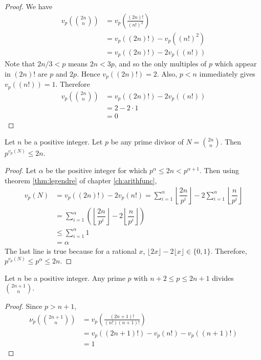 \documentclass{subfile}
\begin{document}
	\begin{proof}
		We have
		\begin{align*}
			v_p \left(\binom{2n}n\right)
				& =v_p \left(\frac{(2n)!}{(n!)^2}\right)\\
				& = v_p((2n)!) - v_p((n!)^2)\\
				& = v_p((2n)!) - 2v_p((n!))
		\end{align*}
		Note that $2n/3<p$ means $2n<3p$, and so the only multiples of $p$ which appear in $(2n)!$ are $p$ and $2p$. Hence $v_p((2n)!) = 2$. Also, $p<n$ immediately gives $v_p((n!))=1$. Therefore
		\begin{align*}
			v_p \left(\binom{2n}n\right)
				& = v_p((2n)!) - 2v_p((n!))\\
				& =  2 - 2 \cdot 1\\
				& = 0
		\end{align*}
	\end{proof}

	\begin{lemma}\label{lem:bertrand3}
		Let $n$ be a positive integer. Let $p$ be any prime divisor of $N=\binom{2n}n$. Then $p^{v_p(N)}\leq2n$.
	\end{lemma}

	\begin{proof}
		Let $\alpha$ be the positive integer for which $p^\alpha \leq 2n<p^{\alpha +1}$. Then using theorem \autoref{thm:legendre} of chapter \eqref{ch:arithfunc},
		\begin{align*}
			v_p(N)
				& =  v_p((2n)!)-2v_p(n!)= \sum_{i=1}^{\alpha}\left\lfloor\dfrac{2n}{p^i}\right\rfloor-2\sum_{i=1}^{\alpha }\left\lfloor\dfrac{n}{p^i}\right\rfloor\\
				& =  \sum_{i=1}^{\alpha}\left(\left\lfloor\dfrac{2n}{p^i}\right\rfloor-2\left\lfloor\dfrac{n}{p^i}\right\rfloor\right)\\
				& \leq \sum_{i=1}^{\alpha}1\\
				& =\alpha
		\end{align*}
		The last line is true because for a rational $x$, $\lfloor2x\rfloor-2\lfloor x\rfloor\in\{0,1\}$. Therefore, $p^{v_p(N)} \leq p^{\alpha} \leq 2n$.
	\end{proof}

	\begin{lemma}\label{lem:bertrand4}
		Let $n$ be a positive integer. Any prime $p$ with $n+2\leq p\leq 2n+1$ divides $\binom{2n+1}{n}$.
	\end{lemma}

	\begin{proof}
		Since $p>n+1$,
		\begin{align*}
			\nu_p\left(\binom{2n+1}{n}\right)
				& =  v_p \left(\frac{(2n+1)!}{(n!)(n+1)!}\right)\\
				& = v_p((2n+1)!)-v_p(n!)-v_p((n+1)!)\\
				& =1
		\end{align*}
	\end{proof}
\end{document}
